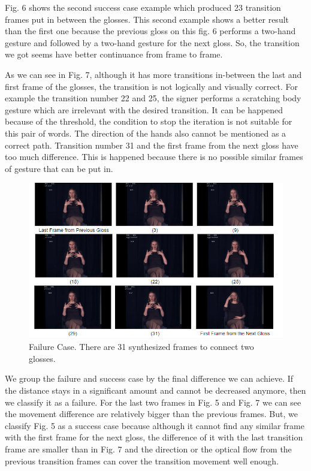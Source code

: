 \documentclass{sig-alternate-05-2015}
\begin{document}
Fig. 6 shows the second success case example which produced 23 transition frames put in between the glosses. This second example shows a better result than the first one because the previous gloss on this fig. 6 performs a two-hand gesture and followed by a two-hand gesture for the next gloss. So, the transition we got seems have better continuance from frame to frame.

As we can see in Fig. 7, although it has more transitions in-between the last and first frame of the glosses, the transition is not logically and visually correct. For example the transition number 22 and 25, the signer performs a scratching body gesture which are irrelevant with the desired transition. It can be happened because of the threshold, the condition to stop the iteration is not suitable for this pair of words. The direction of the hands also cannot be mentioned as a correct path. Transition number 31 and the first frame from the next gloss have too much difference. This is happened because there is no possible similar frames of gesture that can be put in.

\begin{figure}
	\centering
	\includegraphics[width=\linewidth]{img/failure.png}
	\caption{Failure Case. There are 31 synthesized frames to connect two glosses.}
\end{figure}

We group the failure and success case by the final difference we can achieve. If the distance stays in a significant amount and cannot be decreased anymore, then we classify it as a failure. For the last two frames in Fig. 5 and Fig. 7 we can see the movement difference are relatively bigger than the previous frames. But, we classify Fig. 5 as a success case because although it cannot find any similar frame with the first frame for the next gloss, the difference of it with the last transition frame are smaller than in Fig. 7 and the direction or the optical flow from the previous transition frames can cover the transition movement well enough. 
\end{document}
